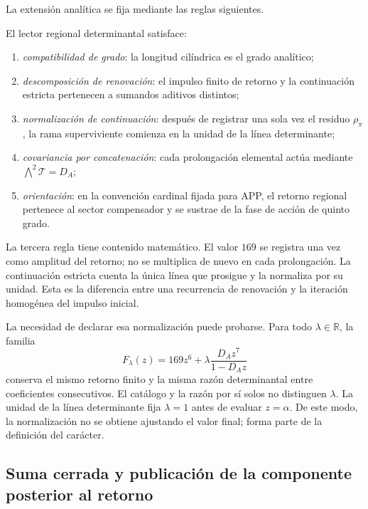 La extensión analítica se fija mediante las reglas siguientes.

\begin{definition}
\label{p3-20260826:def:lector-regional-determinantal}
El lector regional determinantal satisface:
\begin{enumerate}
  \item \emph{compatibilidad de grado}: la longitud cilíndrica es el grado
  analítico;
  \item \emph{descomposición de renovación}: el impulso finito de retorno y
  la continuación estricta pertenecen a sumandos aditivos distintos;
  \item \emph{normalización de continuación}: después de registrar una sola
  vez el residuo \(\rho_\pi\), la rama superviviente comienza en la unidad de
  la línea determinante;
  \item \emph{covariancia por concatenación}: cada prolongación elemental
  actúa mediante \(\bigwedge^2\mathcal T=D_A\);
  \item \emph{orientación}: en la convención cardinal fijada para APP, el
  retorno regional pertenece al sector compensador y se sustrae de la fase
  de acción de quinto grado.
\end{enumerate}
\end{definition}

La tercera regla tiene contenido matemático. El valor \(169\) se registra
una vez como amplitud del retorno; no se multiplica de nuevo en cada
prolongación. La continuación estricta cuenta la única línea que prosigue y
la normaliza por su unidad. Esta es la diferencia entre una recurrencia de
renovación y la iteración homogénea del impulso inicial.

La necesidad de declarar esa normalización puede probarse. Para todo
\(\lambda\in\mathbb R\), la familia
\[
F_\lambda(z)
=169z^6+\lambda\frac{D_Az^7}{1-D_Az}
\]
conserva el mismo retorno finito y la misma razón determinantal entre
coeficientes consecutivos. El catálogo y la razón por sí solos no distinguen
\(\lambda\). La unidad de la línea determinante fija
\(\lambda=1\) antes de evaluar \(z=\alpha\). De este modo, la normalización
no se obtiene ajustando el valor final; forma parte de la definición del
carácter.

\subsection{Suma cerrada y publicación de la componente posterior al retorno}
\label{sec:s102:c38:2:7}

